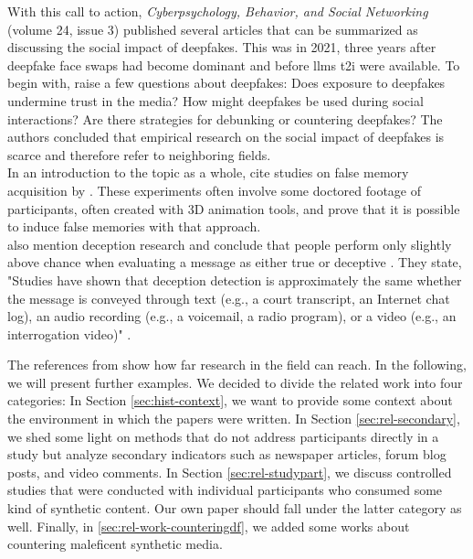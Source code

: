 \documentclass[
  a4paper,  %
  twoside,  %
  bibliography=totoc,
  headsepline,
  cleardoublepage=empty,
  parskip=half,
  draft=false
]{scrbook}
\begin{document}
With this call to action, \textit{Cyberpsychology, Behavior, and Social Networking} (volume 24, issue 3) published several articles that can be summarized as discussing the social impact of deepfakes. This was in 2021, three years after deepfake face swaps had become dominant and before \gls{llm}s \gls{t2i} were available. To begin with, \citet{hancockSocialImpactDeepfakes2021} raise a few questions about deepfakes: Does exposure to deepfakes undermine trust in the media? How might deepfakes be used during social interactions? Are there strategies for debunking or countering deepfakes? The authors concluded that empirical research on the social impact of deepfakes is scarce and therefore refer to neighboring fields. \\
In an introduction to the topic as a whole, \citet{hancockSocialImpactDeepfakes2021} cite studies on false memory acquisition by \citet{garryActuallyPictureWorth2005}. These experiments often involve some doctored footage of participants, often created with 3D animation tools, and prove that it is possible to induce false memories with that approach. \\
\citet{hancockSocialImpactDeepfakes2021} also mention deception research and conclude that people perform only slightly above chance when evaluating a message as either true or deceptive \cite{bondAccuracyDeceptionJudgments2006}. They state, "Studies have shown that deception detection is approximately the same whether the message is conveyed through text (e.g., a court transcript, an Internet chat log), an audio recording (e.g., a voicemail, a radio program), or a video (e.g., an interrogation video)" \cite{hancockSocialImpactDeepfakes2021}.

The references from \citet{hancockSocialImpactDeepfakes2021} show how far research in the field can reach. In the following, we will present further examples. We decided to divide the related work into four categories: In Section \ref{sec:hist-context}, we want to provide some context about the environment in which the papers were written. In Section \ref{sec:rel-secondary}, we shed some light on methods that do not address participants directly in a study but analyze secondary indicators such as newspaper articles, forum blog posts, and video comments. In Section \ref{sec:rel-studypart}, we discuss controlled studies that were conducted with individual participants who consumed some kind of synthetic content. Our own paper should fall under the latter category as well. Finally, in \ref{sec:rel-work-counteringdf}, we added some works about countering maleficent synthetic media.
\end{document}
